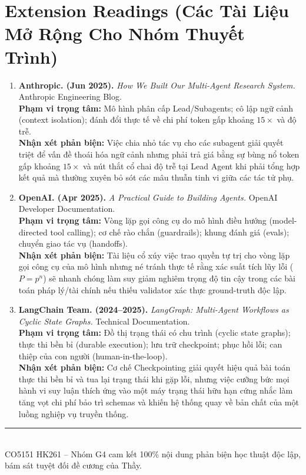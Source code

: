 \documentclass[10pt,a4paper]{article}
\begin{document}
\section{Extension Readings (Các Tài Liệu Mở Rộng Cho Nhóm Thuyết Trình)}
\begin{enumerate}[leftmargin=1.4em, itemsep=6pt, topsep=3pt, start=2]
  \item \textbf{Anthropic. (Jun 2025).} \textit{How We Built Our Multi-Agent Research System.} Anthropic Engineering Blog.\\
  \textbf{Phạm vi trọng tâm:} Mô hình phân cấp Lead/Subagents; cô lập ngữ cảnh (context isolation); đánh đổi thực tế về chi phí token gấp khoảng $15\times$ và độ trễ.\\
  \textcolor{critiquecolor}{\textbf{Nhận xét phản biện:}} Việc chia nhỏ tác vụ cho các subagent giải quyết triệt để vấn đề thoái hóa ngữ cảnh nhưng phải trả giá bằng sự bùng nổ token gấp khoảng $15\times$ và nút thắt cổ chai độ trễ tại Lead Agent khi phải tổng hợp kết quả mà thường xuyên bỏ sót các mâu thuẫn tinh vi giữa các tác tử phụ.

  \item \textbf{OpenAI. (Apr 2025).} \textit{A Practical Guide to Building Agents.} OpenAI Developer Documentation.\\
  \textbf{Phạm vi trọng tâm:} Vòng lặp gọi công cụ do mô hình điều hướng (model-directed tool calling); cơ chế rào chắn (guardrails); khung đánh giá (evals); chuyển giao tác vụ (handoffs).\\
  \textcolor{critiquecolor}{\textbf{Nhận xét phản biện:}} Tài liệu cổ xúy việc trao quyền tự trị cho vòng lặp gọi công cụ của mô hình nhưng né tránh thực tế rằng xác suất tích lũy lỗi ($P = p^n$) sẽ nhanh chóng làm suy giảm nghiêm trọng độ tin cậy trong các bài toán pháp lý/tài chính nếu thiếu validator xác thực ground-truth độc lập.

  \item \textbf{LangChain Team. (2024--2025).} \textit{LangGraph: Multi-Agent Workflows as Cyclic State Graphs.} Technical Documentation.\\
  \textbf{Phạm vi trọng tâm:} Đồ thị trạng thái có chu trình (cyclic state graphs); thực thi bền bỉ (durable execution); lưu trữ checkpoint; phục hồi lỗi; can thiệp của con người (human-in-the-loop).\\
  \textcolor{critiquecolor}{\textbf{Nhận xét phản biện:}} Cơ chế Checkpointing giải quyết hiệu quả bài toán thực thi bền bỉ và tua lại trạng thái khi gặp lỗi, nhưng việc cưỡng bức mọi hành vi suy luận thích ứng vào một máy trạng thái hữu hạn cứng nhắc làm tăng vọt chi phí bảo trì schemas và khiến hệ thống quay về bản chất của một luồng nghiệp vụ truyền thống.
\end{enumerate}

\vspace{0.4cm}
\begin{center}
  \rule{0.6\textwidth}{0.4pt}\\[0.06cm]
  {\tiny \color{darkgray}CO5151 HK261 -- Nhóm G4 cam kết 100\% nội dung phản biện học thuật độc lập, bám sát tuyệt đối đề cương của Thầy.}
\end{center}
\end{document}
